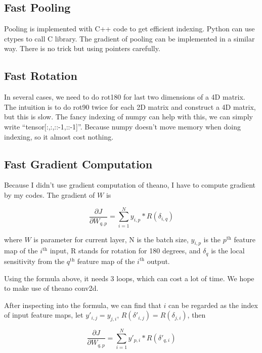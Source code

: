 \documentclass{article} %
\begin{document}
\subsection{Fast Pooling}

Pooling is implemented with C++ code to get efficient indexing. Python can use ctypes to call C library. The gradient of pooling can be implemented in a similar way. There is no trick but using pointers carefully.

\subsection{Fast Rotation}

In several cases, we need to do rot180 for last two dimensions of a 4D matrix. The intuition is to do rot90 twice for each 2D matrix and construct a 4D matrix, but this is slow. The fancy indexing of numpy can help with this, we can simply write ``tensor[:,:,::-1,::-1]''. Because numpy doesn't move memory when doing indexing, so it almost cost nothing.

\subsection{Fast Gradient Computation}

Because I didn't use gradient computation of theano, I have to compute gradient by my codes. The gradient of $W$ is

\begin{equation}
	\frac{\partial J}{\partial W_{q,p}} = \sum_{i=1}^N y_{i, p} * R(\delta_{i, q})
\end{equation}

where $W$ is parameter for current layer, N is the batch size, $y_{i,p}$ is the $p^{\mbox{th}}$ feature map of the $i^{\mbox{th}}$ input, R stands for rotation for 180 degrees, and $\delta_q$ is the local sensitivity from the $q^{\mbox{th}}$ feature map of the $i^{\mbox{th}}$ output. 

Using the formula above, it needs 3 loops, which can cost a lot of time. We hope to make use of theano conv2d.

After inspecting into the formula, we can find that $i$ can be regarded as the index of input feature maps, let $y'_{i,j}=y_{j,i}$, $R(\delta'_{i, j})=R(\delta_{j, i})$, then

\begin{equation}
	\frac{\partial J}{\partial W_{q,p}} = \sum_{i=1}^N y'_{p, i} * R(\delta'_{q, i})
\end{equation}
\end{document}
